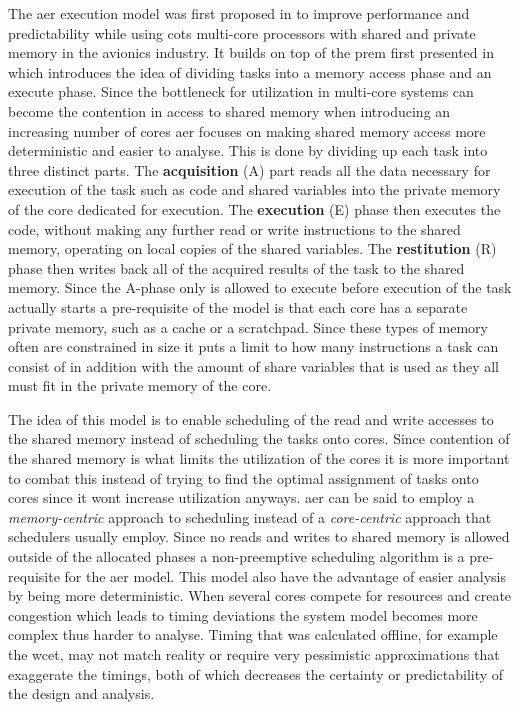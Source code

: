 \documentclass{kththesis}
\begin{document}
The \acrfull{aer} execution model was first proposed in \parencite{durrieu_predictable_2014} to
improve performance and predictability while using \acrshort{cots} multi-core processors with shared
and private memory in the avionics industry. It builds on top of the \acrfull{prem} first presented
in \parencite{pellizzoni_predictable_2011} which introduces the idea of dividing tasks into a memory
access phase and an execute phase. Since the bottleneck for utilization in multi-core systems can
become the contention in access to shared memory when introducing an increasing number of cores
\acrshort{aer} focuses on making shared memory access more deterministic and easier to analyse. This
is done by dividing up each task into three distinct parts. The \textbf{acquisition} (A) part reads all
the data necessary for execution of the task such as code and shared variables into the private
memory of the core dedicated for execution. The \textbf{execution} (E) phase then executes the code,
without making any further read or write instructions to the shared memory, operating on local
copies of the shared variables. The \textbf{restitution} (R) phase then writes back all of the acquired
results of the task to the shared memory. Since the A-phase only is allowed to execute before
execution of the task actually starts a pre-requisite of the model is that each core has a separate
private memory, such as a cache or a scratchpad. Since these types of memory often are constrained
in size it puts a limit to how many instructions a task can consist of in addition with the amount
of share variables that is used as they all must fit in the private memory of the core.

The idea of this model is to enable scheduling of the read and write accesses to the shared memory
instead of scheduling the tasks onto cores. Since contention of the shared memory is what limits the
utilization of the cores it is more important to combat this instead of trying to find the optimal
assignment of tasks onto cores since it wont increase utilization anyways. \acrshort{aer} can be
said to employ a \textit{memory-centric} approach to scheduling instead of a \textit{core-centric}
approach that schedulers usually employ. Since no reads and writes to shared memory is allowed
outside of the allocated phases a non-preemptive scheduling algorithm is a pre-requisite for the
\acrfull{aer} model. This model also have the advantage of easier analysis by being more
deterministic. When several cores compete for resources and create congestion which leads to timing
deviations the system model becomes more complex thus harder to analyse. Timing that was calculated
offline, for example the \acrshort{wcet}, may not match reality or require very pessimistic
approximations that exaggerate the timings, both of which decreases the certainty or predictability
of the design and analysis.
\end{document}

